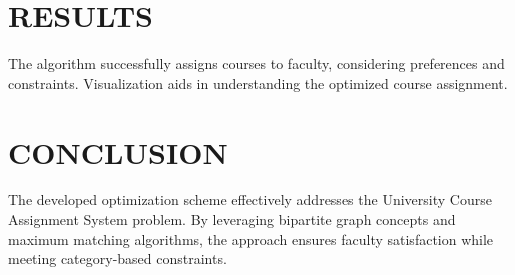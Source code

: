 \documentclass[twoside]{article}
\begin{document}
\section*{RESULTS}

The algorithm successfully assigns courses to faculty, considering preferences and constraints. Visualization aids in understanding the optimized course assignment.

\lipsum[1-4]  %

\section*{CONCLUSION}

The developed optimization scheme effectively addresses the University Course Assignment System problem. By leveraging bipartite graph concepts and maximum matching algorithms, the approach ensures faculty satisfaction while meeting category-based constraints.
\end{document}
